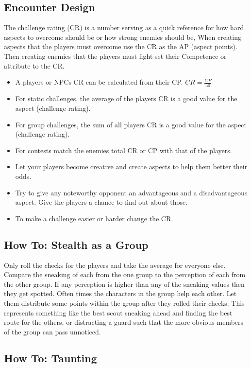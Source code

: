 \documentclass[11pt]{article}
\begin{document}
{\subsection{Encounter Design}
\label{sec:orgb7f9e37}

The challenge rating (CR) is a number serving as a quick reference for how hard aspects to overcome should be or how strong enemies should be, When creating aspects that the players must overcome use the CR as the AP (aspect points). Then creating enemies that the players must fight set their Competence or attribute to the CR.
\begin{itemize}
\item A players or NPCs CR can be calculated from their CP. \(CR = \frac{CP}{50}\)
\item For static challenges, the average of the players CR is a good value for the aspect (challenge rating).
\item For group challenges, the sum of all players CR is a good value for the aspect (challenge rating).
\item For contests match the enemies total CR or CP with that of the players.
\item Let your players become creative and create aspects to help them better their odds.
\item Try to give any noteworthy opponent an advantageous and a disadvantageous aspect. Give the players a chance to find out about those.
\item To make a challenge easier or harder change the CR.
\end{itemize}
\subsection{How To: Stealth as a Group}
\label{sec:orgaa76e4a}

Only roll the checks for the players and take the average for everyone else. Compare the sneaking of each from the one group to the perception of each from the other group. If any perception is higher than any of the sneaking values then they get spotted.
Often times the characters in the group help each other. Let them distribute some points within the group after they rolled their checks. This represents something like the best scout sneaking ahead and finding the best route for the others, or distracting a guard such that the more obvious members of the group can pass unnoticed.
\subsection{How To: Taunting}
\label{sec:org1904e64}

}
\end{document}
